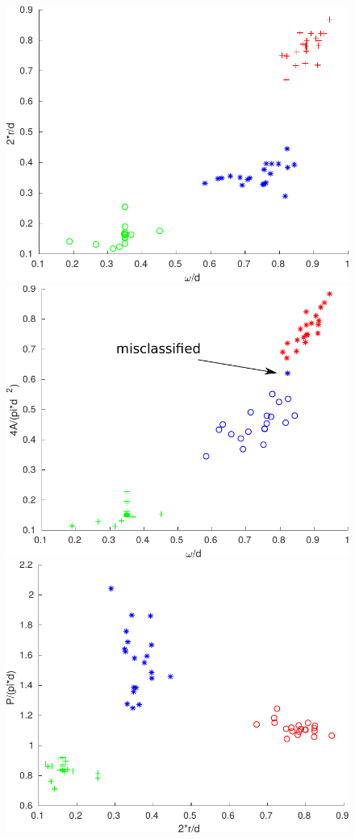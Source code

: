 \begin{figure}[htbp]
 \centering
 \includegraphics[height=.3\textheight]{diag1.pdf}
 \includegraphics[height=.3\textheight]{diag2.pdf}
 \includegraphics[height=.3\textheight]{diag3.pdf}

\end{figure}
